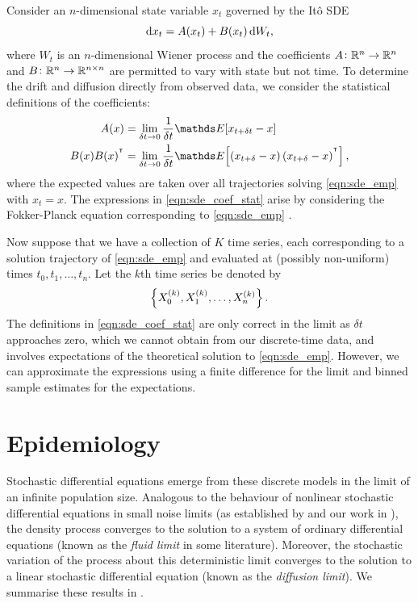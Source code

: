 Consider an \(n\)-dimensional state variable \(x_t\) governed by the It\^o SDE
\begin{equation}\label{eqn:sde_emp}
	\dif x_t = A(x_t) + B(x_t)\dif W_t,
\end{equation}
where \(W_t\) is an \(n\)-dimensional Wiener process and the coefficients \(A \colon \mathbb{R}^n \to \mathbb{R}^n\) and \(B \colon \mathbb{R}^n \to \mathbb{R}^{n\times n}\) are permitted to vary with state but not time.
To determine the drift and diffusion directly from observed data, we consider the statistical definitions of the coefficients:
\begin{subequations}\label{eqn:sde_coef_stat}
	\begin{align}
		A(x)          & = \lim_{\delta t \to 0}\frac{1}{\delta t}\avg{x_{t + \delta t} - x} \label{eqn:sde_coef_stat_drift}                                                \\
		B(x)B(x)^{\T} & = \lim_{\delta t \to 0}\frac{1}{\delta t}\avg{\left(x_{t + \delta} - x\right)\left(x_{t + \delta} - x\right)^{\T}}, \label{eqn:sde_coef_stat_diff}
	\end{align}
\end{subequations}
where the expected values are taken over all trajectories solving \cref{eqn:sde_emp} with \(x_{t} = x\).
The expressions in \cref{eqn:sde_coef_stat} arise by considering the Fokker-Planck equation corresponding to \eqref{eqn:sde_emp} \citehere.

Now suppose that we have a collection of \(K\) time series, each corresponding to a solution trajectory of \cref{eqn:sde_emp} and evaluated at (possibly non-uniform) times \(t_0, t_1, \dotsc, t_n\).
Let the \(k\)th time series be denoted by
\[
	\set{X_{0}^{(k)}, X_{1}^{(k)}, \dotsc, X_{n}^{(k)}}.
\]
The definitions in \cref{eqn:sde_coef_stat} are only correct in the limit as \(\delta t\) approaches zero, which we cannot obtain from our discrete-time data, and involves expectations of the theoretical solution to \eqref{eqn:sde_emp}.
However, we can approximate the expressions using a finite difference for the limit and binned sample estimates for the expectations.




\section{Epidemiology}



Stochastic differential equations emerge from these discrete models in the limit of an infinite population size.
Analogous to the behaviour of nonlinear stochastic differential equations in small noise limits (as established by \citet{FreidlinWentzell_1998_RandomPerturbationsDynamical} and our work in ), the density process converges to the solution to a system of ordinary differential equations (known as the \emph{fluid limit} in some literature).
Moreover, the stochastic variation of the process about this deterministic limit converges to the solution to a linear stochastic differential equation (known as the \emph{diffusion limit}).
We summarise these results in .




